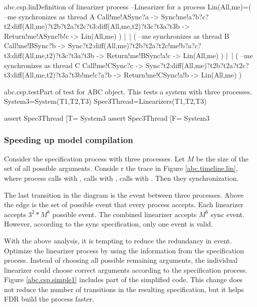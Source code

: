 \documentclass{article}
\begin{document}
\begin{cspfloat}{abc.csp.lin}{Definition of linearizer process}
--Linearizer for a process
Lin(All,me)=(
  --me synchronizes as thread A
  Call!me!ASync?a ->
  Sync!me!a?b?c?t2:diff(All,{me})?t2b?t2a?t2c?t3:diff(All,{me,t2})?t3c?t3a?t3b ->
  Return!me!ASync!b!c ->
  Lin(All,me)
) |~| (
  --me synchronizes as thread B
  Call!me!BSync?b ->
  Sync?t2:diff(All,{me})?t2b?t2a?t2c!me!b?a?c?t3:diff(All,{me,t2})?t3c?t3a?t3b ->
  Return!me!BSync!a!c ->
  Lin(All,me)
) |~| (
  --me synchronizes as thread C
  Call!me!CSync?c ->
  Sync?t2:diff(All,{me})?t2b?t2a?t2c?t3:diff(All,{me,t2})?t3a?t3b!me!c?a?b ->
  Return!me!CSync!a!b ->
  Lin(All,me)
)
\end{cspfloat}

\begin{cspinline}{abc.csp.test}{Part of test for ABC object. This tests a system with three processes.}
System3=System({T1,T2,T3})
Spec3Thread=Linearizers({T1,T2,T3})

assert Spec3Thread [T= System3
assert Spec3Thread [F= System3
\end{cspinline}
\subsubsection{Speeding up model compilation}
Consider the specification process with three processes. Let $M$ be the size of the set of all possible arguments. Conside r the trace in Figure \ref{abc.timeline.lin}, where process  calls  with ,  calls  with ,  calls  with . Then they synchronization.


The last transition in the diagram is the  event between three processes. Above the edge is the set of possible  event that every process accepts. Each linearizer accepts $3^2*M^8$ possible  event. The combined linearizer accepts $M^6$ sync event. However, according to the sync specification, only one  event is valid. 
    
With the above analysis, it is tempting to reduce the redundancy in  event. Optimize the linearizer process by using the information from the specification process. Instead of choosing all possible remaining arguments, the individual linearizer could choose correct arguments according to the specification process. Figure \ref{abc.csp.simple1} includes part of the simplified code. This change does not reduce the number of transitions in the resulting specification, but it helps FDR build the process faster.
\end{document}
